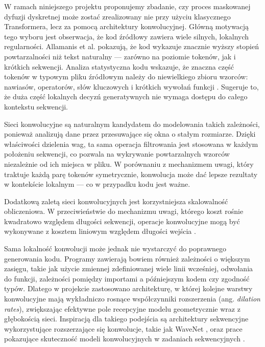 W ramach niniejszego projektu proponujemy zbadanie, czy proces maskowanej dyfuzji dyskretnej może zostać zrealizowany nie przy użyciu klasycznego Transformera, lecz za pomocą architektury konwolucyjnej. Główną motywacją tego wyboru jest obserwacja, że kod źródłowy zawiera wiele silnych, lokalnych regularności. Allamanis et al. \cite{allamanis2018survey} pokazują, że kod wykazuje znacznie wyższy stopień powtarzalności niż tekst naturalny — zarówno na poziomie tokenów, jak i krótkich sekwencji. Analiza statystyczna kodu wskazuje, że znaczna część tokenów w typowym pliku źródłowym należy do niewielkiego zbioru wzorców: nawiasów, operatorów, słów kluczowych i krótkich wywołań funkcji \cite{bielik2016phog}. Sugeruje to, że duża część lokalnych decyzń generatywnych nie wymaga dostępu do całego kontekstu sekwencji.

Sieci konwolucyjne są naturalnym kandydatem do modelowania takich zależności, ponieważ analizują dane przez przesuwające się okna o stałym rozmiarze. Dzięki właściwości dzielenia wag, ta sama operacja filtrowania jest stosowana w każdym położeniu sekwencji, co pozwala na wykrywanie powtarzalnych wzorców niezależnie od ich miejsca w pliku. W porównaniu z mechanizmem uwagi, który traktuje każdą parę tokenów symetrycznie, konwolucja może dać lepsze rezultaty w kontekście lokalnym — co w przypadku kodu jest ważne.

Dodatkową zaletą sieci konwolucyjnych jest korzystniejsza skalowalność obliczeniowa. W przeciwieństwie do mechanizmu uwagi, którego koszt rośnie kwadratowo względem długości sekwencji, operacje konwolucyjne mogą być wykonywane z kosztem liniowym względem długości wejścia \cite{wu2019pay, gehring2017convolutional}.

Sama lokalność konwolucji może jednak nie wystarczyć do poprawnego generowania kodu. Programy zawierają bowiem również zależności o większym zasięgu, takie jak użycie zmiennej zdefiniowanej wiele linii wcześniej, odwołania do funkcji, zależności pomiędzy importami a późniejszym kodem czy zgodność typów. Dlatego w projekcie zastosowano architekturę, w której kolejne warstwy konwolucyjne mają wykładniczo rosnące współczynniki rozszerzenia (ang. \textit{dilation rates}), zwiększając efektywne pole recepcyjne modelu geometrycznie wraz z głębokością sieci. Inspiracją dla takiego podejścia są architektury sekwencyjne wykorzystujące rozszerzające się konwolucje, takie jak WaveNet \cite{oord2016wavenet}, oraz prace pokazujące skuteczność modeli konwolucyjnych w zadaniach sekwencyjnych \cite{bai2018empirical}.